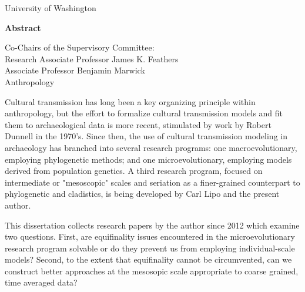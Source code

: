 \begin{titlingpage}
\begin{center}

{\large University of Washington \par}

\vskip 0.75cm

 {\large \textbf{Abstract} \par}%
 
 \vskip 0.75cm
 
    { \thesisTitle\par}
    
    \vskip 0.5cm
  
      { \thesisAuthor\par}%
      
      \vskip 0.5cm
      
      {Co-Chairs of the Supervisory Committee:\\
      Research Associate Professor James K. Feathers\\
	Associate Professor Benjamin Marwick\\
	Anthropology\\}

\end{center}
	
\DoubleSpacing
\noindent Cultural transmission has long been a key organizing principle within anthropology, but the effort to formalize cultural transmission models and fit them to archaeological data is more recent, stimulated by work by Robert Dunnell in the 1970's.  Since then, the use of cultural transmission modeling in archaeology has branched into several research programs:  one macroevolutionary, employing phylogenetic methods; and one microevolutionary, employing models derived from population genetics.  A third research program, focused on intermediate or "mesoscopic" scales and seriation as a finer-grained counterpart to phylogenetic and cladistics, is being developed by Carl Lipo and the present author.  

This dissertation collects research papers by the author since 2012 which examine two questions.  First, are equifinality issues encountered in the microevolutionary research program solvable or do they prevent us from employing individual-scale models?  Second, to the extent that equifinality cannot be circumvented, can we construct better approaches at the mesosopic scale appropriate to coarse grained, time averaged data?


\end{titlingpage}
